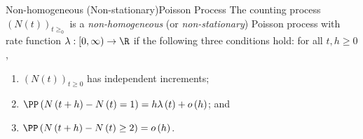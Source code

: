 \documentclass[stat333]{subfiles}
\begin{document}
    \begin{definition}{Non-homogeneous (Non-stationary)}{Poisson Process}
        The counting process $\left( N\left( t \right) \right)^{}_{t\geq_0}$ is a \emph{non-homogeneous} (or \emph{non-stationary}) Poisson process with rate function $\lambda:\left[ 0,\infty \right)\to\R$ if the following three conditions hold: for all $t,h\geq 0$,
        \begin{enumerate}
            \item $\left( N\left( t \right) \right)^{}_{t\geq 0}$ has independent increments;
            \item $\PP\left( N\left( t+h \right)-N\left( t \right)=1 \right) = h\lambda\left( t \right)+o\left( h \right)$; and
            \item $\PP\left( N\left( t+h \right)-N\left( t \right)\geq 2 \right)=o\left( h \right)$.
        \end{enumerate}
    \end{definition}
\end{document}

